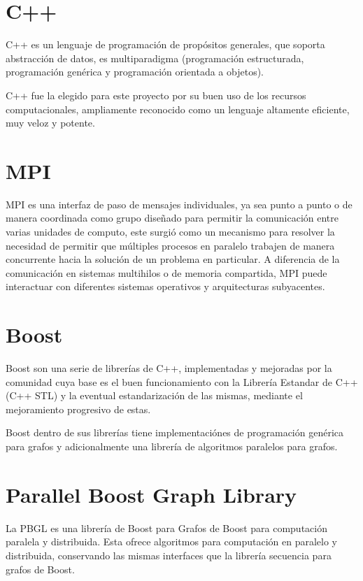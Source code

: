 \section{C++}

C++ es un lenguaje de programación de propósitos generales,  que soporta abstracción de datos, es multiparadigma (programación estructurada, programación genérica\cite{andrei2001modern} y programación orientada a objetos).

C++ fue la elegido para este proyecto por su buen uso de los recursos computacionales, ampliamente reconocido como un lenguaje altamente eficiente, muy veloz y potente. \cite{stroustrup2013c++}


\section{MPI}

MPI es una interfaz de paso de mensajes individuales, ya sea punto a punto o de manera coordinada como grupo diseñado para permitir la comunicación entre varias unidades de computo, este surgió como un mecanismo para resolver la necesidad de permitir que múltiples procesos en paralelo trabajen de manera concurrente hacia la solución de un problema en particular. A diferencia de la comunicación en sistemas multihilos o de memoria compartida, MPI puede interactuar con diferentes sistemas operativos y arquitecturas subyacentes.   \cite{Karniadakis} \cite{BoostMPI}


\section{Boost}

Boost son una serie de librerías de C++, implementadas y mejoradas por la comunidad cuya base es el buen funcionamiento con la Librería Estandar de C++ (C++ STL) y la eventual estandarización de las mismas, mediante el mejoramiento progresivo de estas.\cite{wwwBoost}

Boost dentro de sus librerías tiene implementaciónes de programación genérica para grafos y adicionalmente una librería de algoritmos paralelos para grafos. \cite{siek2001boost}


\section{Parallel Boost Graph Library}

La PBGL es una librería de Boost para Grafos de Boost para computación paralela y distribuida. Esta ofrece algoritmos para computación en paralelo y distribuida, conservando las mismas interfaces que la librería secuencia para grafos de Boost.\cite{wwwBoost} 
